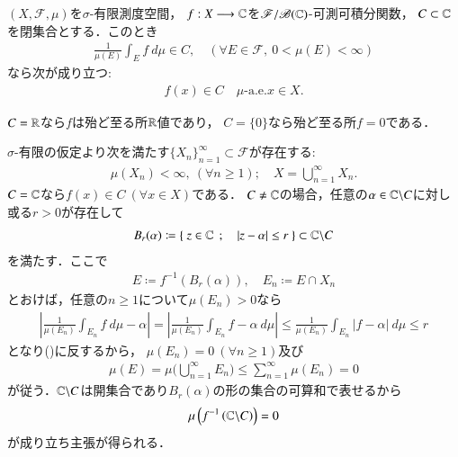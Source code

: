 	\begin{screen}
		\begin{thm}[積分の平均値と写像の値域の関係]\label{thm:mean_value_of_integral_and_closed_set}
			$(X,\mathscr{F},\mu)$を$\sigma$-有限測度空間，
			$f:X \longrightarrow \mathbb{C}$を$\mathscr{F}/\mathscr{B}(\mathbb{C})$-可測可積分関数，
			$C \subset \mathbb{C}$を閉集合とする．このとき
			\begin{align}
				\frac{1}{\mu(E)}\int_E f\ d\mu \in C,
				\quad (\forall E \in \mathscr{F},\ 0 < \mu(E) < \infty)
				\label{eq:thm_mean_value_of_integral_and_closed_set}
			\end{align}
			なら次が成り立つ:
			\begin{align}
				f(x) \in C \quad \mbox{$\mu$-a.e.}x \in X.
			\end{align}
		\end{thm}
	\end{screen}
	$C=\mathbb{R}$なら$f$は殆ど至る所$\mathbb{R}$値であり，
	$C=\{0\}$なら殆ど至る所$f=0$である．
	\begin{prf}
		$\sigma$-有限の仮定より次を満たす$\{X_n\}_{n=1}^\infty \subset \mathscr{F}$が存在する:
		\begin{align}
			\mu(X_n) < \infty,\ (\forall n \geq 1);
			\quad X = \bigcup_{n=1}^\infty X_n.
		\end{align}
		$C = \mathbb{C}$なら$f(x) \in C\ (\forall x \in X)$である．
		$C \neq \mathbb{C}$の場合，任意の$\alpha \in \mathbb{C} \backslash C$に対し
		或る$r > 0$が存在して
		\begin{align}
			B_r(\alpha) \coloneqq \left\{\ z \in \mathbb{C}\ \, ; \quad |z - \alpha| \leq r\ \right\} \subset \mathbb{C} \backslash C
		\end{align}
		を満たす．ここで
		\begin{align}
			E \coloneqq f^{-1}\left( B_r(\alpha) \right),
			\quad E_n \coloneqq E \cap X_n
		\end{align}
		とおけば，任意の$n \geq 1$について$\mu(E_n) > 0$なら
		\begin{align}
			\left| \frac{1}{\mu(E_n)}\int_{E_n} f\ d\mu - \alpha \right|
			= \left| \frac{1}{\mu(E_n)}\int_{E_n} f - \alpha\ d\mu \right|
			\leq \frac{1}{\mu(E_n)}\int_{E_n} |f - \alpha|\ d\mu
			\leq r
		\end{align}
		となり()に反するから，
		$\mu(E_n) = 0\ (\forall n \geq 1)$及び
		\begin{align}
			\mu(E) = \mu\Biggl( \bigcup_{n=1}^\infty E_n \Biggr) 
			\leq \sum_{n=1}^\infty \mu(E_n) = 0
		\end{align}
		が従う．$\mathbb{C} \backslash C$は開集合であり$B_r(\alpha)$の形の集合の可算和で表せるから
		\begin{align}
			\mu\left( f^{-1}\left( \mathbb{C} \backslash C \right) \right) = 0
		\end{align}
		が成り立ち主張が得られる．
		\QED
	\end{prf}
	
